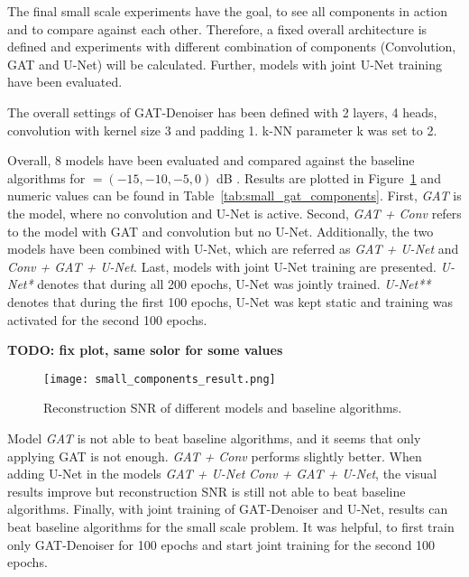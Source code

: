 The final small scale experiments have the goal, to see all components in action and 
to compare against each other.
Therefore, a fixed overall architecture is defined and experiments
with different combination of components (Convolution, GAT and U-Net) will be calculated.
Further, models with joint U-Net training have been evaluated.

The overall settings of GAT-Denoiser has been defined with 2 layers, 4 heads, convolution with 
kernel size 3 and padding 1. k-NN parameter k was set to 2.


Overall, 8 models have been evaluated and compared against the baseline algorithms for  \snry $ = (-15,-10,-5,0) $ dB .
Results are plotted in Figure~\ref{fig:small_components} and numeric values can be found in Table~\ref{tab:small_gat_components}.
First, \textit{GAT} is the model, where no convolution and 
U-Net is active. Second, \textit{GAT + Conv} refers to the model 
with GAT and convolution but no U-Net.
Additionally, the two models have been combined with U-Net, which are referred as 
\textit{GAT + U-Net} and \textit{Conv + GAT + U-Net}.
Last, models with joint U-Net training are presented.
\textit{U-Net*} denotes that during all 200 epochs, U-Net was jointly trained.
\textit{U-Net**} denotes that during the first 100 epochs, U-Net was kept static 
and training was activated for the second 100 epochs.

\textbf{TODO: fix plot, same solor for some values}

\begin{figure}[H]
  \centering
  \label{fig:small_components}
  \texttt{[image: small\_components\_result.png]}
  \caption{
    Reconstruction SNR of different models and baseline algorithms.
    }
\end{figure}

Model \textit{GAT} is not able to beat baseline algorithms, and it seems that only applying GAT is not enough.
\textit{GAT + Conv} performs slightly better. When adding U-Net in the models \textit{GAT + U-Net} \textit{Conv + GAT + U-Net},
the visual results improve but reconstruction SNR is still not able to beat baseline algorithms.
Finally, with joint training of GAT-Denoiser and U-Net, 
results can beat baseline algorithms for the small scale problem. It was helpful, to first train only GAT-Denoiser for 100 epochs 
and start joint training for the second 100 epochs.


